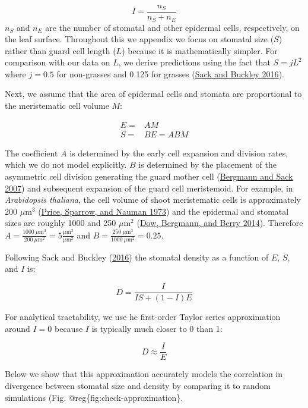 \documentclass[
  12pt,
]{article}
\begin{document}
\[I = \frac{n_S}{n_S + n_E}\]
\(n_S\) and \(n_E\) are the number of stomatal and other epidermal cells, respectively, on the leaf surface. Throughout this we appendix we focus on stomatal size (\(S\)) rather than guard cell length (\(L\)) because it is mathematically simpler. For comparison with our data on \(L\), we derive predictions using the fact that \(S = j L^2\) where \(j=0.5\) for non-grasses and 0.125 for grasses (\protect\hyperlink{ref-sack_developmental_2016}{Sack and Buckley 2016}).

Next, we assume that the area of epidermal cells and stomata are proportional to the meristematic cell volume \(M\):

\begin{align}
  E = & A M \\
  S = & B E = A B M
  \label{eq:eq1}
\end{align}

The coefficient \(A\) is determined by the early cell expansion and division rates, which we do not model explicitly. \(B\) is determined by the placement of the asymmetric cell division generating the guard mother cell (\protect\hyperlink{ref-bergmann_stomatal_2007}{Bergmann and Sack 2007}) and subsequent expansion of the guard cell meristemoid. For example, in \emph{Arabidopsis thaliana}, the cell volume of shoot meristematic cells is approximately 200 \(\mu\textrm{m}^3\) (\protect\hyperlink{ref-price_correlations_1973}{Price, Sparrow, and Nauman 1973}) and the epidermal and stomatal sizes are roughly 1000 and 250 \(\mu\textrm{m}^2\) (\protect\hyperlink{ref-dow_integrated_2014}{Dow, Bergmann, and Berry 2014}). Therefore \(A = \frac{1000~\mu\textrm{m}^3}{200 ~\mu\textrm{m}^2} = 5 \frac{\mu\textrm{m}^3}{\mu\textrm{m}^2}\) and \(B = \frac{250~\mu\textrm{m}^3}{1000 ~\mu\textrm{m}^2} = 0.25\).

Following Sack and Buckley (\protect\hyperlink{ref-sack_developmental_2016}{2016}) the stomatal density as a function of \(E\), \(S\), and \(I\) is:

\[D = \frac{I}{IS + (1 - I) E}\]

For analytical tractability, we use he first-order Taylor series approximation around \(I = 0\) because \(I\) is typically much closer to 0 than 1:

\[D \approx \frac{I}{E}\]

Below we show that this approximation accurately models the correlation in divergence between stomatal size and density by comparing it to random simulations (Fig. @reg\{fig:check-approximation\}.
\end{document}
